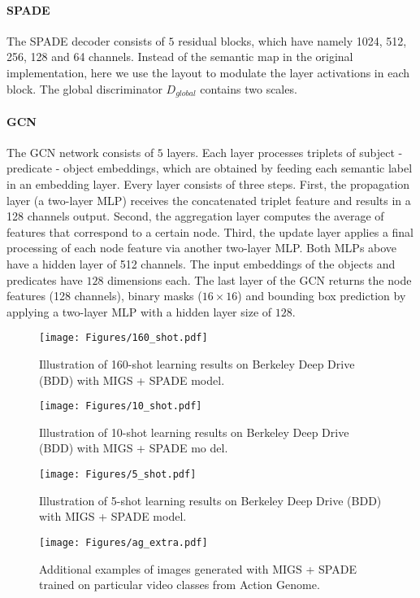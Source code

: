 \documentclass{bmvc2k}
\begin{document}
\paragraph{SPADE} The SPADE decoder consists of $5$ residual blocks, which have namely 1024, 512, 256, 128 and 64 channels. Instead of the semantic map in the original implementation, here we use the layout to modulate the layer activations in each block. The global discriminator $D_{global}$ contains two scales. 

\paragraph{GCN} The GCN network consists of $5$ layers. Each layer processes triplets of subject - predicate - object embeddings, which are obtained by feeding each semantic label in an embedding layer. Every layer consists of three steps. First, the propagation layer (a two-layer MLP) receives the concatenated triplet feature and results in a 128 channels output. Second, the aggregation layer computes the average of features that correspond to a certain node. Third, the update layer applies a final processing of each node feature via another two-layer MLP. Both MLPs above have a hidden layer of 512 channels. The input embeddings of the objects and predicates have $128$ dimensions each.
The last layer of the GCN returns the node features (128 channels), binary masks ($16\times16$) and bounding box prediction by applying a two-layer MLP with a hidden layer size of $128$.


\begin{figure*}
    \centering
    \texttt{[image: Figures/160\_shot.pdf]}
    \caption{Illustration of 160-shot learning results on Berkeley Deep Drive (BDD) with MIGS + SPADE model.}
    \label{fig:160shot}
\end{figure*}

\begin{figure*}
    \centering
    \texttt{[image: Figures/10\_shot.pdf]}
    \caption{Illustration of 10-shot learning results on Berkeley Deep Drive (BDD) with MIGS + SPADE mo    del.}
    \label{fig:10shot}
\end{figure*}

\begin{figure*}
    \centering
    \texttt{[image: Figures/5\_shot.pdf]}
    \caption{Illustration of 5-shot learning results on Berkeley Deep Drive (BDD) with MIGS + SPADE model.}
    \label{fig:5shot}
\end{figure*}

\begin{figure}
    \centering
    \texttt{[image: Figures/ag\_extra.pdf]}
    \caption{Additional examples of images generated with MIGS + SPADE trained on particular video classes from Action Genome.}
    \label{fig:ag_extra}
\end{figure}
\end{document}
